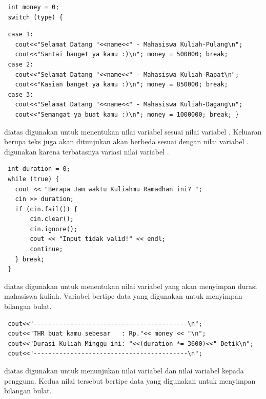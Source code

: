 \documentclass[../main.tex]{subfiles}
\begin{document}
\begin{lstlisting}
 int money = 0;
 switch (type) {
\end{lstlisting}
\begin{lstlisting}
 case 1:
   cout<<"Selamat Datang "<<name<<" - Mahasiswa Kuliah-Pulang\n";
   cout<<"Santai banget ya kamu :)\n"; money = 500000; break;
 case 2:
   cout<<"Selamat Datang "<<name<<" - Mahasiswa Kuliah-Rapat\n";
   cout<<"Kasian banget ya kamu :)\n"; money = 850000; break;
 case 3:
   cout<<"Selamat Datang "<<name<<" - Mahasiswa Kuliah-Dagang\n";
   cout<<"Semangat ya buat kamu :)\n"; money = 1000000; break; }
\end{lstlisting}
    \ilz{}{\Script} diatas digunakan untuk menentukan nilai variabel  sesuai nilai variabel . Keluaran berupa teks juga akan ditunjukan akan berbeda sesuai dengan nilai variabel . {\Statement}  digunakan karena terbatasnya variasi nilai variabel .

\begin{lstlisting}
 int duration = 0;
 while (true) {
   cout << "Berapa Jam waktu Kuliahmu Ramadhan ini? ";
   cin >> duration;
   if (cin.fail()) {
       cin.clear();
       cin.ignore();
       cout << "Input tidak valid!" << endl;
       continue;
   } break;
 }
\end{lstlisting}
    \vspace{-0.25ex}
    \ilz{}{\Script} diatas digunakan untuk menentukan nilai variabel  yang akan menyimpan durasi mahasiswa kuliah. Variabel  bertipe data  yang digunakan untuk menyimpan bilangan bulat.

\begin{lstlisting}
 cout<<"------------------------------------------\n";
 cout<<"THR buat kamu sebesar   : Rp."<< money << "\n";
 cout<<"Durasi Kuliah Minggu ini: "<<(duration *= 3600)<<" Detik\n";
 cout<<"------------------------------------------\n";
\end{lstlisting}
    \vspace{-0.25ex}
    \ilz{}{\Script} diatas digunakan untuk menunjukan nilai variabel  dan nilai variabel  kepada pengguna. Kedua nilai tersebut bertipe data  yang digunakan untuk menyimpan bilangan bulat.
\end{document}
